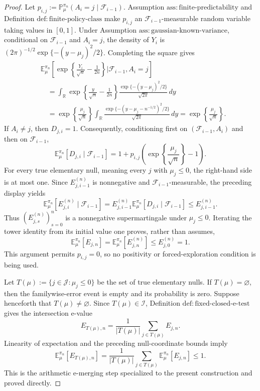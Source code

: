 \documentclass{article}
\begin{document}
\begin{proof}
Let \(p_{i,j}:=\mathbb P_\mu^{\pi_n}(A_i=j\mid\mathcal F_{i-1})\).  Assumption \(\mathrm{ass:finite\text{-}predictability}\) and Definition \(\mathrm{def:finite\text{-}policy\text{-}class}\) make \(p_{i,j}\) an \(\mathcal F_{i-1}\)-measurable random variable taking values in \([0,1]\).  Under Assumption \(\mathrm{ass:gaussian\text{-}known\text{-}variance}\), conditional on \(\mathcal F_{i-1}\) and \(A_i=j\), the density of \(Y_i\) is \((2\pi)^{-1/2}\exp\{-(y-\mu_j)^2/2\}\).  Completing the square gives
\[
\begin{aligned}
&\mathbb E_\mu^{\pi_n}\!\left[
 \exp\!\left\{\frac{Y_i}{\sqrt n}-\frac{1}{2n}\right\}
 \mathrel{\Big|}\mathcal F_{i-1},A_i=j
\right]\\
&\quad=\int_{\mathbb R}
 \exp\!\left\{\frac{y}{\sqrt n}-\frac{1}{2n}\right\}
 \frac{\exp\{-(y-\mu_j)^2/2\}}{\sqrt{2\pi}}\,dy\\
&\quad=\exp\!\left\{\frac{\mu_j}{\sqrt n}\right\}
 \int_{\mathbb R}\frac{\exp\{-(y-\mu_j-n^{-1/2})^2/2\}}{\sqrt{2\pi}}\,dy
=\exp\!\left\{\frac{\mu_j}{\sqrt n}\right\}.
\end{aligned}
\]
If \(A_i\neq j\), then \(D_{j,i}=1\).  Consequently, conditioning first on \((\mathcal F_{i-1},A_i)\) and then on \(\mathcal F_{i-1}\),
\[
\mathbb E_\mu^{\pi_n}[D_{j,i}\mid\mathcal F_{i-1}]
=1+p_{i,j}\left(\exp\!\left\{\frac{\mu_j}{\sqrt n}\right\}-1\right).
\]
For every true elementary null, meaning every \(j\) with \(\mu_j\leq0\), the right-hand side is at most one.  Since \(E^{(n)}_{j,i-1}\) is nonnegative and \(\mathcal F_{i-1}\)-measurable, the preceding display yields
\[
\mathbb E_\mu^{\pi_n}[E^{(n)}_{j,i}\mid\mathcal F_{i-1}]
=E^{(n)}_{j,i-1}\mathbb E_\mu^{\pi_n}[D_{j,i}\mid\mathcal F_{i-1}]
\leq E^{(n)}_{j,i-1}.
\]
Thus \((E^{(n)}_{j,s})_{s=0}^n\) is a nonnegative supermartingale under \(\mu_j\leq0\).  Iterating the tower identity from its initial value one proves, rather than assumes,
\[
\mathbb E_\mu^{\pi_n}[E_{j,n}]
=\mathbb E_\mu^{\pi_n}[E^{(n)}_{j,n}]
\leq E^{(n)}_{j,0}=1.
\]
This argument permits \(p_{i,j}=0\), so no positivity or forced-exploration condition is being used.

Let \(T(\mu):=\{j\in\mathcal J:\mu_j\leq0\}\) be the set of true elementary nulls.  If \(T(\mu)=\varnothing\), then the familywise-error event is empty and its probability is zero.  Suppose henceforth that \(T(\mu)\neq\varnothing\).  Since \(T(\mu)\in\mathcal I\), Definition \(\mathrm{def:fixed\text{-}closed\text{-}e\text{-}test}\) gives the intersection e-value
\[
E_{T(\mu),n}=\frac{1}{|T(\mu)|}\sum_{j\in T(\mu)}E_{j,n}.
\]
Linearity of expectation and the preceding null-coordinate bounds imply
\[
\mathbb E_\mu^{\pi_n}[E_{T(\mu),n}]
=\frac{1}{|T(\mu)|}\sum_{j\in T(\mu)}
 \mathbb E_\mu^{\pi_n}[E_{j,n}]
\leq1.
\]
This is the arithmetic e-merging step specialized to the present construction and proved directly.


\end{proof}
\end{document}
